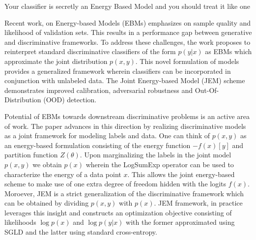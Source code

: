 \documentclass[11pt,letterpaper]{article}
\begin{document}
\begin{center}
  \large{Your classifier is secretly an Energy Based Model and you should treat it like one}
\end{center}

Recent work, on Energy-based Models (EBMs) emphasizes on sample quality and likelihood of validation sets. This results in a performance gap between generative and discriminative frameworks. To address these challenges, the work proposes to reinterpret standard discriminative classifiers of the form $p(y|x)$ as EBMs which approximate the joint distribution $p(x,y)$. This novel formulation of models provides a generalized framework wherein classifiers can be incorporated in conjunction with unlabeled data. The Joint Energy-based Model (JEM) scheme demonstrates improved calibration, adversarial robustness and Out-Of-Distribution (OOD) detection. 

Potential of EBMs towards downstream discriminative problems is an active area of work. The paper advances in this direction by realizing discriminative models as a joint framework for modeling labels and data. One can think of $p(x,y)$ as an energy-based formulation consisting of the energy function $-f(x)[y]$ and partition function $Z(\theta)$. Upon marginalizing the labels in the joint model $p(x,y)$ we obtain $p(x)$ wherein the LogSumExp operator can be used to characterize the energy of a data point $x$. This allows the joint energy-based scheme to make use of one extra degree of freedom hidden with the logits $f(x)$. Moroever, JEM is a strict generalization of the discriminative framework which can be obtained by dividing $p(x,y)$ with $p(x)$. JEM framework, in practice leverages this insight and constructs an optimization objective consisting of likelihoods $\log p(x)$ and $\log p(y|x)$ with the former approximated using SGLD and the latter using standard cross-entropy. 
\end{document}
